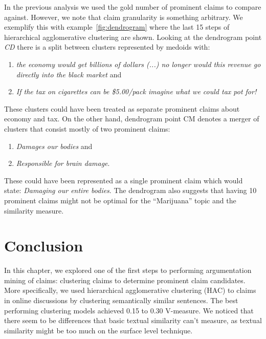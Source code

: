 In the previous analysis we used the gold number of prominent claims to compare
against. However, we note that claim granularity is something arbitrary. 
We exemplify this with example~\ref{fig:dendrogram} where the last 15 steps of
hierarchical agglomerative clustering are shown. 
Looking at the dendrogram point \emph{CD} there is a split between clusters
represented by medoids with: 
\begin{enumerate}[label=(\arabic*)]
\item \textit{the economy would get billions of dollars (...) no longer 
	would this revenue
go directly into the black market} and 
\item \textit{If the tax on cigarettes can
be \$5.00/pack imagine what we could tax pot for!}
\end{enumerate}
These clusters could have been treated as separate prominent claims about
economy and tax. 
On the other hand, dendrogram point CM denotes a merger of clusters that
consist mostly of two prominent claims: 
\begin{enumerate}[label=(\arabic*)]
\item \textit{Damages our bodies} and 
\item \textit{Responsible for brain damage}.
\end{enumerate}
These could have been represented as a single prominent claim which would state: 
\textit{Damaging our entire bodies}. 
The dendrogram also suggests that having 10 prominent claims might not be optimal 
for the ``Marijuana'' topic and the similarity measure. 

\section{Conclusion}
\label{sec:argclu_conclusion}

In this chapter, we explored one of the first steps to performing argumentation
mining of claims: clustering claims to determine prominent claim candidates.
More specifically, we used hierarchical agglomerative clustering (HAC) to
claims in online discussions by clustering semantically similar sentences.  The
best performing clustering models achieved 0.15 to 0.30 V-measure. 
We noticed that there seem to be differences that basic textual similarity
can't measure, as textual similarity might be too much on the surface level technique. 

